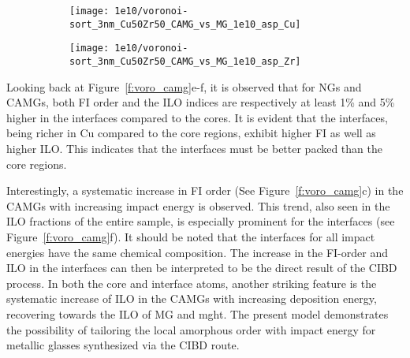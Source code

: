 \begin{figure}[!ht]
	\centering
	\begin{subfigure}{0.45\linewidth} \centering \texttt{[image: 1e10/voronoi-sort\_3nm\_Cu50Zr50\_CAMG\_vs\_MG\_1e10\_asp\_Cu]} 
		\subcaption{} \end{subfigure}%
	\hspace{1cm}
	\begin{subfigure}{0.45\linewidth} \centering \texttt{[image: 1e10/voronoi-sort\_3nm\_Cu50Zr50\_CAMG\_vs\_MG\_1e10\_asp\_Zr]}
		\subcaption{} \end{subfigure}
	\label{f:vorosort_cu-zr}
\end{figure}


\begin{changebar}
Looking back at Figure~\ref{f:voro_camg}e-f, it is observed that for NGs and CAMGs, both FI order and the ILO indices are respectively at least 1\% and 5\% higher in the interfaces compared to the cores. It is evident that the interfaces, being richer in Cu compared to the core regions, exhibit higher FI as well as higher ILO. This indicates that the interfaces must be better packed than the core regions. \par

Interestingly, a systematic increase in FI order (See Figure~\ref{f:voro_camg}c) in the CAMGs with increasing impact energy is observed. This trend, also seen in the ILO fractions of the entire sample, is especially prominent for the interfaces (see Figure~\ref{f:voro_camg}f). It should be noted that the interfaces for all impact energies have the same chemical composition. The increase in the FI-order and ILO in the interfaces can then be interpreted to be the direct result of the CIBD process. In both the core and interface atoms, another striking feature is the systematic increase of ILO in the CAMGs with increasing deposition energy, recovering towards the ILO of MG and \gls{mght}. The present model demonstrates the possibility of tailoring the local amorphous order with impact energy for metallic glasses synthesized via the CIBD route.

\end{changebar}



